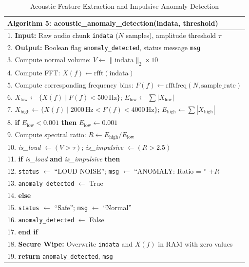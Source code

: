 \documentclass[12pt,a4paper,oneside]{report}
\begin{document}
\begin{table}[htbp]
\caption{Acoustic Feature Extraction and Impulsive Anomaly Detection}
\centering
\small
{}
\begin{tabular}{p{5.5in}}
\hline
\textbf{Algorithm 5: acoustic\_anomaly\_detection(indata, threshold)} \\ \hline
1. \textbf{Input:} Raw audio chunk \texttt{indata} ($N$ samples), amplitude threshold $\tau$ \\
2. \textbf{Output:} Boolean flag \texttt{anomaly\_detected}, status message \texttt{msg} \\
3. Compute normal volume: $V \leftarrow \|\text{indata}\|_2 \times 10$ \\
4. Compute FFT: $X(f) \leftarrow \text{rfft}(\text{indata})$ \\
5. Compute corresponding frequency bins: $F(f) \leftarrow \text{rfftfreq}(N, \text{sample\_rate})$ \\
6. $X_{\text{low}} \leftarrow \{X(f) \mid F(f) < 500\,\text{Hz}\}$; \quad $E_{\text{low}} \leftarrow \sum |X_{\text{low}}|$ \\
7. $X_{\text{high}} \leftarrow \{X(f) \mid 2000\,\text{Hz} < F(f) < 4000\,\text{Hz}\}$; \quad $E_{\text{high}} \leftarrow \sum |X_{\text{high}}|$ \\
8. \textbf{if} $E_{\text{low}} < 0.001$ \textbf{then} $E_{\text{low}} \leftarrow 0.001$ \\
9. Compute spectral ratio: $R \leftarrow E_{\text{high}} / E_{\text{low}}$ \\
10. \textit{is\_loud} $\leftarrow (V > \tau)$; \quad \textit{is\_impulsive} $\leftarrow (R > 2.5)$ \\
11. \textbf{if} \textit{is\_loud} \textbf{and} \textit{is\_impulsive} \textbf{then} \\
12. \quad \texttt{status} $\leftarrow$ ``LOUD NOISE''; \quad \texttt{msg} $\leftarrow$ ``ANOMALY: Ratio = '' $+ R$ \\
13. \quad \texttt{anomaly\_detected} $\leftarrow$ True \\
14. \textbf{else} \\
15. \quad \texttt{status} $\leftarrow$ ``Safe''; \quad \texttt{msg} $\leftarrow$ ``Normal'' \\
16. \quad \texttt{anomaly\_detected} $\leftarrow$ False \\
17. \textbf{end if} \\
18. \textbf{Secure Wipe:} Overwrite \texttt{indata} and $X(f)$ in RAM with zero values \\
19. \textbf{return} \texttt{anomaly\_detected}, \texttt{msg} \\ \hline
\end{tabular}
\label{tab:acoustic_algorithm}
\end{table}
\end{document}
